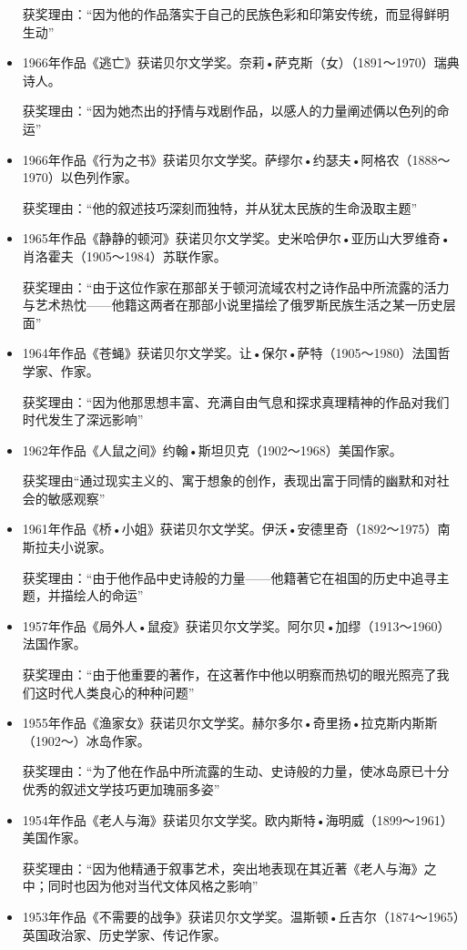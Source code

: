 \documentclass[UTF8,a4paper,8pt]{ctexart}
\begin{document}
\begin{itemize}
			获奖理由：“因为他的作品落实于自己的民族色彩和印第安传统，而显得鲜明生动”
			\item 1966年作品《逃亡》获诺贝尔文学奖。奈莉•萨克斯（女）（1891～1970）瑞典诗人。
			
			获奖理由：“因为她杰出的抒情与戏剧作品，以感人的力量阐述俩以色列的命运”
			\item 1966年作品《行为之书》获诺贝尔文学奖。萨缪尔•约瑟夫•阿格农（1888～1970）以色列作家。
			
			获奖理由：“他的叙述技巧深刻而独特，并从犹太民族的生命汲取主题” 
			\item 1965年作品《静静的顿河》获诺贝尔文学奖。史米哈伊尔•亚历山大罗维奇•肖洛霍夫（1905～1984）苏联作家。
			
			获奖理由：“由于这位作家在那部关于顿河流域农村之诗作品中所流露的活力与艺术热忱——他籍这两者在那部小说里描绘了俄罗斯民族生活之某一历史层面”
			\item 1964年作品《苍蝇》获诺贝尔文学奖。让•保尔•萨特（1905～1980）法国哲学家、作家。
			
			获奖理由：“因为他那思想丰富、充满自由气息和探求真理精神的作品对我们时代发生了深远影响”
			\item 1962年作品《人鼠之间》约翰•斯坦贝克（1902～1968）美国作家。
			
			获奖理由“通过现实主义的、寓于想象的创作，表现出富于同情的幽默和对社会的敏感观察”
			\item 1961年作品《桥•小姐》获诺贝尔文学奖。伊沃•安德里奇（1892～1975）南斯拉夫小说家。
			
			获奖理由：“由于他作品中史诗般的力量——他籍著它在祖国的历史中追寻主题，并描绘人的命运”
			\item 1957年作品《局外人•鼠疫》获诺贝尔文学奖。阿尔贝•加缪（1913～1960）法国作家。
			
			获奖理由：“由于他重要的著作，在这著作中他以明察而热切的眼光照亮了我们这时代人类良心的种种问题”
			\item 1955年作品《渔家女》获诺贝尔文学奖。赫尔多尔•奇里扬•拉克斯内斯斯（1902～）冰岛作家。
			
			获奖理由：“为了他在作品中所流露的生动、史诗般的力量，使冰岛原已十分优秀的叙述文学技巧更加瑰丽多姿”
			\item 1954年作品《老人与海》获诺贝尔文学奖。欧内斯特•海明威（1899～1961）美国作家。
			
			获奖理由：“因为他精通于叙事艺术，突出地表现在其近著《老人与海》之中；同时也因为他对当代文体风格之影响”
			\item 1953年作品《不需要的战争》获诺贝尔文学奖。温斯顿•丘吉尔（1874～1965）英国政治家、历史学家、传记作家。
			

\end{itemize}
\end{document}
